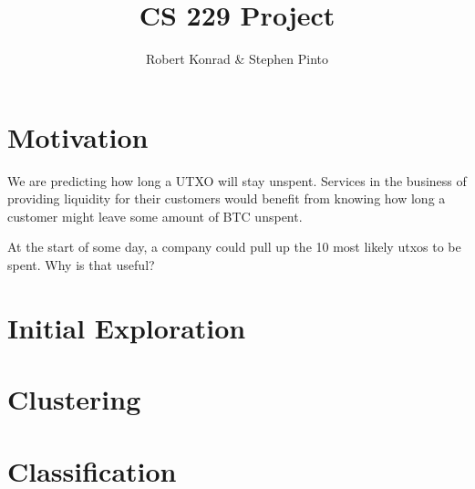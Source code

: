 \documentclass[12pt]{article}
\title{CS 229 Project}
\author{Robert Konrad \& Stephen Pinto}
\begin{document}
\maketitle

\section{Motivation} %
\label{sec:motivation}
We are predicting how long a UTXO will stay unspent. Services in the business of providing liquidity for their customers would benefit from knowing how long a customer might leave some amount of BTC unspent.

At the start of some day, a company could pull up the 10 most likely utxos to be spent. Why is that useful?

\section{Initial Exploration}


\section{Clustering}

\section{Classification}
\end{document}

